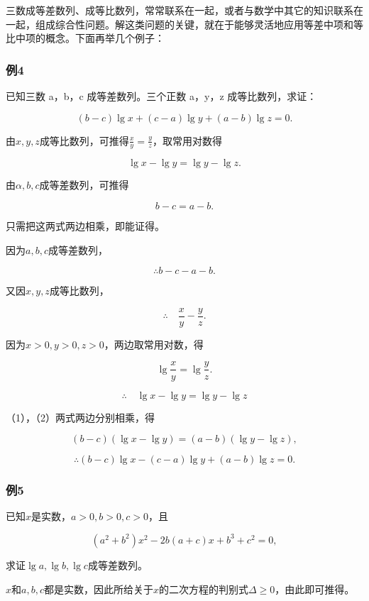 三数成等差数列、成等比数列，常常联系在一起，或者与数学中其它的知识联系在一起，组成综合性问题。解这类问题的关键，就在于能够灵活地应用等差中项和等比中项的概念。下面再举几个例子：

\subsubsection{例4}

已知三数 a，b，c 成等差数列。三个正数 a，y，z 成等比数列，求证：

\[
(b - c) \lg x + (c - a) \lg y + (a - b) \lg z = 0.
\]

由\(x, y, z\)成等比数列，可推得\(\frac{x}{y} = \frac{y}{z}\)，取常用对数得

\[
\lg x - \lg y = \lg y - \lg z.
\]

由\(\alpha, b, c\)成等差数列，可推得

\[
b - c = a - b.
\]

只需把这两式两边相乘，即能证得。

 因为\(a, b, c\)成等差数列，

\[
\therefore b - c - a - b. \tag {1}
\]

又因\(x, y, z\)成等比数列，

\[
\therefore \quad \frac{x}{y} - \frac{y}{z}.
\]

因为\(x > 0, y > 0, z > 0\)，两边取常用对数，得

\[
\lg \frac{x}{y} = \lg \frac{y}{z}.
\]

\[
\therefore \quad \lg x - \lg y = \lg y - \lg z \tag {2}
\]

（1），（2）两式两边分别相乘，得

\[
(b - c) (\lg x - \lg y) = (a - b) (\lg y - \lg z),
\]

\[
\therefore (b - c) \lg x - (c - a) \lg y + (a - b) \lg z = 0.
\]

\subsubsection{例5}

已知\(x\)是实数，\(a > 0, b > 0, c > 0\)，且

\[
(a^{2} + b^{2}) x^{2} - 2 b (a + c) x + b^{3} + c^{2} = 0,
\]

求证\(\lg a, \lg b, \lg c\)成等差数列。

\(x\)和\(a, b, c\)都是实数，因此所给关于\(x\)的二次方程的判别式\(\Delta \geqslant 0\)，由此即可推得。

